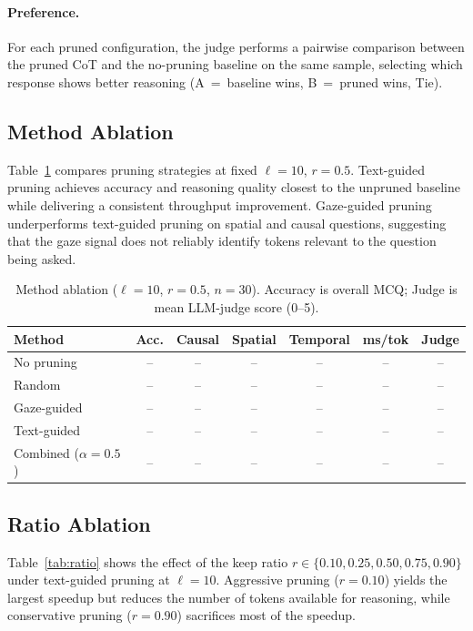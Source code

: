 \paragraph{Preference.}
For each pruned configuration, the judge performs a pairwise comparison
between the pruned CoT and the no-pruning baseline on the same sample,
selecting which response shows better reasoning (A~=~baseline wins,
B~=~pruned wins, Tie).

\subsection{Method Ablation}

Table~\ref{tab:method} compares pruning strategies at fixed
$\ell = 10$, $r = 0.5$.
Text-guided pruning achieves accuracy and reasoning quality closest to
the unpruned baseline while delivering a consistent throughput improvement.
Gaze-guided pruning underperforms text-guided pruning on spatial and
causal questions, suggesting that the gaze signal does not reliably
identify tokens relevant to the question being asked.

\begin{table}[h]
\centering
\caption{Method ablation ($\ell=10$, $r=0.5$, $n=30$).
Accuracy is overall MCQ; Judge is mean LLM-judge score (0--5).}
\label{tab:method}
\small
\begin{tabular}{lcccccc}
\toprule
\textbf{Method} & \textbf{Acc.} & \textbf{Causal} & \textbf{Spatial} & \textbf{Temporal}
  & \textbf{ms/tok} & \textbf{Judge} \\
\midrule
No pruning       & -- & -- & -- & -- & -- & -- \\
Random           & -- & -- & -- & -- & -- & -- \\
Gaze-guided      & -- & -- & -- & -- & -- & -- \\
Text-guided      & -- & -- & -- & -- & -- & -- \\
Combined ($\alpha=0.5$) & -- & -- & -- & -- & -- & -- \\
\bottomrule
\end{tabular}
\end{table}

\subsection{Ratio Ablation}

Table~\ref{tab:ratio} shows the effect of the keep ratio $r \in
\{0.10, 0.25, 0.50, 0.75, 0.90\}$ under text-guided pruning at $\ell = 10$.
Aggressive pruning ($r = 0.10$) yields the largest speedup
but reduces the number of tokens available for reasoning,
while conservative pruning ($r = 0.90$) sacrifices most of the speedup.


